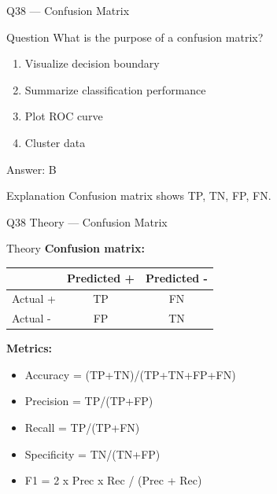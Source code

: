 \documentclass[aspectratio=169,8pt]{beamer}
\begin{document}
	\begin{frame}{Q38 --- Confusion Matrix}
		\begin{block}{Question}
			What is the purpose of a confusion matrix?
		\end{block}
		\begin{enumerate}[label=\Alph*.]
			\item Visualize decision boundary
			\item Summarize classification performance
			\item Plot ROC curve
			\item Cluster data
		\end{enumerate}
		\begin{exampleblock}{Answer: B}
		\end{exampleblock}
		\begin{block}{Explanation}
			Confusion matrix shows TP, TN, FP, FN.
		\end{block}
	\end{frame}
	
	\begin{frame}{Q38 Theory --- Confusion Matrix}
		\begin{block}{Theory}
			\textbf{Confusion matrix:}
			\begin{center}
				\small
				\begin{tabular}{@{}lcc@{}}
					\toprule
					& Predicted + & Predicted - \\
					\midrule
					Actual + & TP & FN \\
					Actual - & FP & TN \\
					\bottomrule
				\end{tabular}
			\end{center}
			\textbf{Metrics:}
			\begin{itemize}
				\item Accuracy = (TP+TN)/(TP+TN+FP+FN)
				\item Precision = TP/(TP+FP)
				\item Recall = TP/(TP+FN)
				\item Specificity = TN/(TN+FP)
				\item F1 = 2 x Prec x Rec / (Prec + Rec)
			\end{itemize}
		\end{block}
	\end{frame}
	
\end{document}
